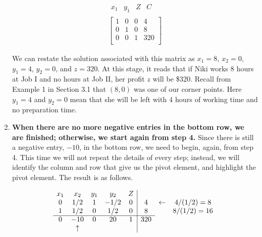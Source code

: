 \begin{solution}
\begin{enumerate}
              \[
                  \begin{array}{c}
                      \begin{array}{cccc}
                          x_1 & y_1 & Z & C
                      \end{array} \\
                      \left[
                          \begin{array}{ccc|c}
                              1 & 0 & 0 & 4   \\
                              0 & 1 & 0 & 8   \\
                              0 & 0 & 1 & 320 \\
                          \end{array}
                          \right]
                  \end{array}
              \]

              We can restate the solution associated with this matrix as $x_1 = 8$, $x_2 = 0$, $y_1 = 4$, $y_2 = 0$, and $z = 320$. At this stage, it reads that if Niki works 8 hours at Job I and no hours at Job II, her profit $z$ will be \$320. Recall from Example 1 in Section 3.1 that $(8, 0)$ was one of our corner points. Here $y_1 = 4$ and $y_2 = 0$ mean that she will be left with 4 hours of working time and no preparation time.
        \item \textbf{When there are no more negative entries in the bottom row, we are finished; otherwise, we start again from step 4.}
              Since there is still a negative entry, $-10$, in the bottom row, we need to begin, again, from step 4. This time we will not repeat the details of every step; instead, we will identify the column and row that give us the pivot element, and highlight the pivot element. The result is as follows.

              \[
                  \begin{array}{ccccc|ccc}

                      x_1 & x_2      & y_1 & y_2  & Z &     &            &              \\

                      0   & 1/2      & 1   & -1/2 & 0 & 4   & \leftarrow & 4/(1/2) = 8  \\
                      1   & 1/2      & 0   & 1/2  & 0 & 8   &            & 8/(1/2) = 16 \\
                      \cline{1-6}
                      0   & -10      & 0   & 20   & 1 & 320 &            &              \\
                          & \uparrow &     &      &   &     &            &
                  \end{array}
              \]


\end{enumerate}
\end{solution}
